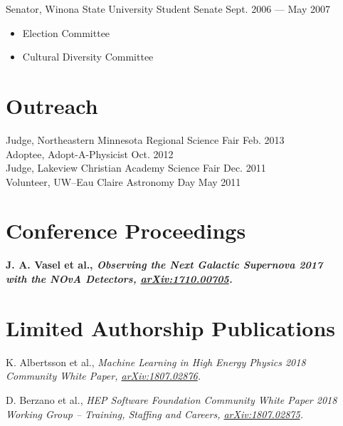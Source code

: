 \documentclass[11pt]{cv}
\begin{document}
\begin{cv}
Senator, Winona State University Student Senate \hfill Sept. 2006 --- May 2007
\begin{itemize}
  \item Election Committee
  \item Cultural Diversity Committee
\end{itemize}


\section{Outreach}
Judge, Northeastern Minnesota Regional Science Fair \hfill Feb. 2013 \\
Adoptee, Adopt-A-Physicist \hfill Oct. 2012 \\
Judge, Lakeview Christian Academy Science Fair \hfill Dec. 2011 \\
Volunteer, UW--Eau Claire Astronomy Day \hfill May 2011


\section{Conference Proceedings}
\begin{etaremune}
  \item \bf J. A. Vasel \rm et al., \it Observing the Next Galactic Supernova \rm \hfill 2017 \\
  \it with the NOvA Detectors, \rm \href{http://arxiv.org/abs/arXiv:1710.00705}{arXiv:1710.00705}.
\end{etaremune}

\newpage

\section{Limited Authorship Publications}
\begin{etaremune}
  \item K. Albertsson et al., \it Machine Learning in High Energy Physics \rm \hfill 2018 \\
  \it Community White Paper, \rm \href{https://arxiv.org/abs/1807.02876}{arXiv:1807.02876}.
  \item D. Berzano et al., \it HEP Software Foundation Community White Paper \rm \hfill 2018 \\
  \it Working Group -- Training, Staffing and Careers, \rm \href{https://arxiv.org/abs/1807.02875}{arXiv:1807.02875}.
\end{etaremune}



\end{cv}
\end{document}
